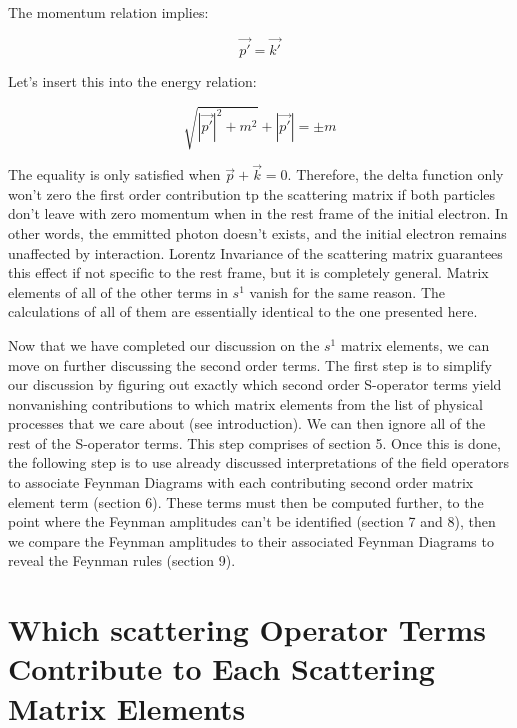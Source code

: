 \documentclass[a4]{article}
\begin{document}
\begin{framed}
        The momentum relation implies: 

        \begin{equation}
            \vec{p'} = \vec{k'}
        \end{equation}

        Let's insert this into the energy relation:

        \begin{equation}
            \sqrt{|\vec{p'}|^{2} + m^{2}} + |\vec{p'}| = \pm m
        \end{equation}

        The equality is only satisfied when $\vec{p} + \vec{k} = 0$. Therefore, the delta function only won't zero the first order contribution 
        tp the scattering matrix if both particles don't leave with zero momentum when in the rest frame of the initial electron. In other words,
        the emmitted photon doesn't exists, and the initial electron remains unaffected by interaction. Lorentz Invariance of the scattering
        matrix guarantees this effect if not specific to the rest frame, but it is completely general. Matrix elements of all of the other terms
        in $s^{1}$ vanish for the same reason. The calculations of all of them are essentially identical to the one presented here.

    \end{framed}

    Now that we have completed our discussion on the $s^{1}$ matrix elements, we can move on further discussing the second order terms. The first
    step is to simplify our discussion by figuring out exactly which second order S-operator terms yield nonvanishing contributions to which matrix
    elements from the list of physical processes that we care about (see introduction). We can then ignore all of the rest of the S-operator terms.
    This step comprises of section 5. Once this is done, the following step is to use already discussed interpretations of the field operators to
    associate Feynman Diagrams with each contributing second order matrix element term (section 6). These terms must then be computed further, to
    the point where the Feynman amplitudes can't be identified (section 7 and 8), then we compare the Feynman amplitudes to their associated Feynman
    Diagrams to reveal the Feynman rules (section 9).

    \section{Which scattering Operator Terms Contribute to Each Scattering Matrix Elements}
\end{document}
